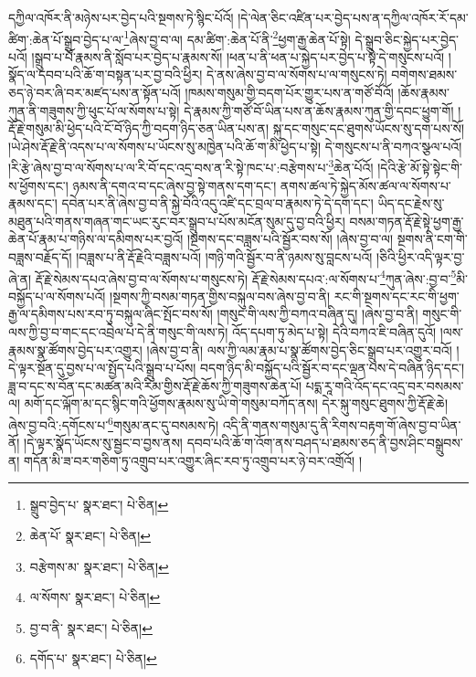 དཀྱིལ་འཁོར་ནི་མཉེས་པར་བྱེད་པའི་སྔགས་ཏེ་སྙིང་པོའོ། །དེ་ལེན་ཅིང་འཛིན་པར་བྱེད་པས་ན་དཀྱིལ་འཁོར་རོ་དམ་ཚིག་:ཆེན་པོ་སྒྲུབ་བྱེད་པ་ལ་\footnote{སྒྲུབ་བྱེད་པ་  སྣར་ཐང་།  པེ་ཅིན། }ཞེས་བྱ་བ་ལ། དམ་ཚིག་:ཆེན་པོ་ནི་\footnote{ཆེན་པོ་  སྣར་ཐང་།  པེ་ཅིན། }ཕྱག་རྒྱ་ཆེན་པོ་སྟེ། དེ་སྒྲུབ་ཅིང་སྐྱེད་པར་བྱེད་པའོ། །སྒྲུབ་པ་པོ་རྣམས་ནི་སློབ་པར་བྱེད་པ་རྣམས་སོ། །ཕན་པ་ནི་ཕན་པ་སྐྱེད་པར་བྱེད་པ་སྟེ་དེ་གསུངས་པའོ། །སྣོད་ལ་དབབ་པའི་ཆོ་ག་བསྟན་པར་བྱ་བའི་ཕྱིར། དེ་ནས་ཞེས་བྱ་བ་ལ་སོགས་པ་ལ་གསུངས་ཏེ། བགེགས་ཐམས་ཅད་ཉེ་བར་ཞི་བར་མཛད་པས་ན་སྟོན་པའོ། །ཁམས་གསུམ་གྱི་བདག་པོར་གྱུར་པས་ན་གཙོ་བོའོ། །ཆོས་རྣམས་ཀུན་ནི་གཟུགས་ཀྱི་ཕུང་པོ་ལ་སོགས་པ་སྟེ། དེ་རྣམས་ཀྱི་གཙོ་བོ་ཡིན་པས་ན་ཆོས་རྣམས་ཀུན་གྱི་དབང་ཕྱུག་གོ། །རྡོ་རྗེ་གསུམ་མི་ཕྱེད་པའི་ངོ་བོ་ཉིད་ཀྱི་བདག་ཉིད་ཅན་ཡིན་པས་ན། སྐུ་དང་གསུང་དང་ཐུགས་ཡོངས་སུ་དག་པས་སོ། །ཡེ་ཤེས་རྡོ་རྗེ་ནི་འདས་པ་ལ་སོགས་པ་ཡོངས་སུ་མཁྱེན་པའི་ཆོ་ག་མི་ཕྱེད་པ་སྟེ། དེ་གསུངས་པ་ནི་བཀའ་སྩལ་པའོ། །རི་རྩེ་ཞེས་བྱ་བ་ལ་སོགས་པ་ལ་རི་བོ་དང་འདྲ་བས་ན་རི་སྟེ་ཁང་པ་:བརྩེགས་པ་\footnote{བརྩེགས་མ་  སྣར་ཐང་།  པེ་ཅིན། }ཆེན་པོའོ། །དེའི་རྩེ་མོ་སྟེ་སྟེང་གི་ས་ཕྱོགས་དང་། ཉམས་ནི་དགའ་བ་དང་ཞེས་བྱ་སྟེ་གནས་དག་དང་། ནགས་ཚལ་ཏེ་སྐྱེད་མོས་ཚལ་ལ་སོགས་པ་རྣམས་དང་། དབེན་པར་ནི་ཞེས་བྱ་བ་ནི་སྐྱེ་བོའི་འདུ་འཛི་དང་བྲལ་བ་རྣམས་ཏེ་དེ་དག་དང་། ཡིད་དང་རྗེས་སུ་མཐུན་པའི་གནས་གཞན་གང་ཡང་རུང་བར་སྒྲུབ་པ་པོས་མངོན་སུམ་དུ་བྱ་བའི་ཕྱིར། བསམ་གཏན་རྡོ་རྗེ་སྟེ་ཕྱག་རྒྱ་ཆེན་པོ་རྣམ་པ་གཉིས་ལ་དམིགས་པར་བྱའོ། །སྔགས་དང་བཟླས་པའི་སྦྱོར་བས་སོ། །ཞེས་བྱ་བ་ལ། སྔགས་ནི་ངག་གི་བཟླས་བརྗོད་དོ། །བཟླས་པ་ནི་རྡོ་རྗེའི་བཟླས་པའོ། །གཉི་གའི་སྦྱོར་བ་ནི་ཉམས་སུ་བླངས་པའོ། །ཅིའི་ཕྱིར་འདི་ལྟར་བྱ་ཞེ་ན། རྡོ་རྗེ་སེམས་དཔའ་ཞེས་བྱ་བ་ལ་སོགས་པ་གསུངས་ཏེ། རྡོ་རྗེ་སེམས་དཔའ་:ལ་སོགས་པ་\footnote{ལ་སོགས་  སྣར་ཐང་།  པེ་ཅིན། }ཀུན་ཞེས་:བྱ་བ་\footnote{བྱ་བ་ནི་  སྣར་ཐང་།  པེ་ཅིན། }མི་བསྐྱོད་པ་ལ་སོགས་པའོ། །སྔགས་ཀྱི་བསམ་གཏན་གྱིས་བསྐུལ་བས་ཞེས་བྱ་བ་ནི། རང་གི་སྔགས་དང་རང་གི་ཕྱག་རྒྱ་ལ་དམིགས་པས་རབ་ཏུ་བསྐུལ་ཞིང་སྤོང་བས་སོ། །གསུང་གི་ལས་ཀྱི་བཀའ་བཞིན་དུ། །ཞེས་བྱ་བ་ནི། གསུང་གི་ལས་ཀྱི་བྱ་བ་གང་དང་འབྲེལ་པ་དེ་ནི་གསུང་གི་ལས་ཏེ། འོད་དཔག་ཏུ་མེད་པ་སྟེ། དེའི་བཀའ་ཇི་བཞིན་དུའོ། །ལས་རྣམས་སྣ་ཚོགས་བྱེད་པར་འགྱུར། །ཞེས་བྱ་བ་ནི། ལས་ཀྱི་ལམ་རྣམ་པ་སྣ་ཚོགས་བྱེད་ཅིང་སྒྲུབ་པར་འགྱུར་བའོ། །དེ་ལྟར་སྔོན་དུ་བྱས་པ་ལ་སྤྱོད་པའི་སྒྲུབ་པ་པོས། བདག་ཉིད་མི་བསྐྱོད་པའི་སྦྱོར་བ་དང་ལྡན་པས་དེ་བཞིན་ཉིད་དང་། ཟླ་བ་དང་ས་བོན་དང་མཚན་མའི་རིམ་གྱིས་རྡོ་རྗེ་ཆོས་ཀྱི་གཟུགས་ཆེན་པོ། པདྨ་རཱ་གའི་འོད་དང་འདྲ་བར་བསམས་ལ། མགོ་དང་ལྐོག་མ་དང་སྙིང་གའི་ཕྱོགས་རྣམས་སུ་ཡི་གེ་གསུམ་བཀོད་ནས། དེར་སྐུ་གསུང་ཐུགས་ཀྱི་རྡོ་རྗེ་ཆེ། ཞེས་བྱ་བའི་:དགོངས་པ་\footnote{དགོད་པ་  སྣར་ཐང་།  པེ་ཅིན། }གསུམ་ནང་དུ་བསམས་ཏེ། འདི་ནི་གནས་གསུམ་དུ་ནི་རིགས་བརྟག་གོ་ཞེས་བྱ་བ་ཡིན་ནོ། །དེ་ལྟར་སྣོད་ཡོངས་སུ་སྦྱང་བ་བྱས་ནས། དབབ་པའི་ཆོ་ག་འོག་ནས་བཤད་པ་ཐམས་ཅད་ནི་བྱས་ཤིང་བསྒྲུབས་ན། གདོན་མི་ཟ་བར་གཅིག་ཏུ་འགྲུབ་པར་འགྱུར་ཞིང་རབ་ཏུ་འགྲུབ་པར་ཉེ་བར་འགྲོའོ། །
